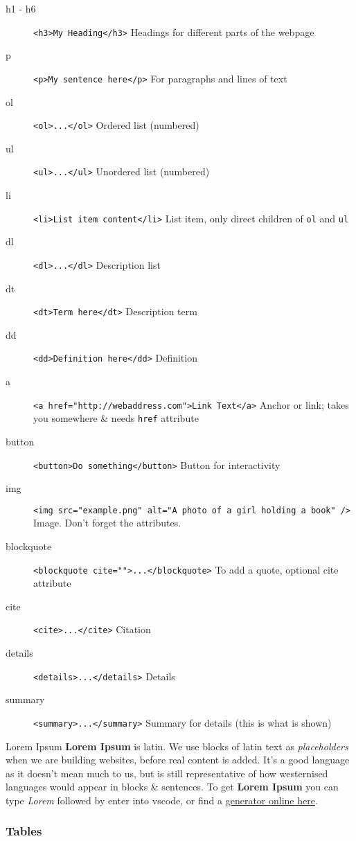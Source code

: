 \begin{description}
	\item[h1 - h6] \texttt{<h3>My Heading</h3>} Headings for different parts of the webpage
	\item[p] \texttt{<p>My sentence here</p>} For paragraphs and lines of text
	\item[ol] \texttt{<ol>...</ol>} Ordered list (numbered)
	\item[ul] \texttt{<ul>...</ul>} Unordered list (numbered)
	\item[li] \texttt{<li>List item content</li>} List item, only direct children of \texttt{ol} and \texttt{ul}
	\item[dl] \texttt{<dl>...</dl>} Description list
	\item[dt] \texttt{<dt>Term here</dt>} Description term
	\item[dd] \texttt{<dd>Definition here</dd>} Definition
	\item[a] \texttt{<a href="http://webaddress.com">Link Text</a>} Anchor or link; takes you somewhere \& needs \texttt{href} attribute
	\item[button] \texttt{<button>Do something</button>} Button for interactivity
	\item[img] \texttt{<img src="example.png" alt="A photo of a girl holding a book" />} Image. Don't forget the attributes.
	\item[blockquote] \texttt{<blockquote cite="">...</blockquote>} To add a quote, optional cite attribute
	\item[cite] \texttt{<cite>...</cite>} Citation
	\item[details] \texttt{<details>...</details>} Details
	\item[summary] \texttt{<summary>...</summary>} Summary for details (this is what is shown)
\end{description}

\begin{infobox}{Lorem Ipsum}
    \textbf{Lorem Ipsum} is latin. We use blocks of latin text as \textit{placeholders} when we are building websites, before real content is added. It's a good language as it doesn't mean much to us, but is still representative of how westernised languages would appear in blocks \& sentences.
    To get \textbf{Lorem Ipsum} you can type \textit{Lorem} followed by enter into vscode, or find a \href{https://www.lipsum.com/}{generator online here}.
\end{infobox}

\subsubsection{Tables}

